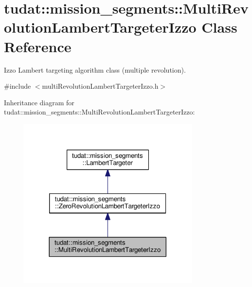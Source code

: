 \hypertarget{classtudat_1_1mission__segments_1_1MultiRevolutionLambertTargeterIzzo}{}\section{tudat\+:\+:mission\+\_\+segments\+:\+:Multi\+Revolution\+Lambert\+Targeter\+Izzo Class Reference}
\label{classtudat_1_1mission__segments_1_1MultiRevolutionLambertTargeterIzzo}


Izzo Lambert targeting algorithm class (multiple revolution).  




{\ttfamily \#include $<$multi\+Revolution\+Lambert\+Targeter\+Izzo.\+h$>$}



Inheritance diagram for tudat\+:\+:mission\+\_\+segments\+:\+:Multi\+Revolution\+Lambert\+Targeter\+Izzo\+:
\nopagebreak
\begin{figure}[H]
\begin{center}
\leavevmode
\includegraphics[width=260pt]{classtudat_1_1mission__segments_1_1MultiRevolutionLambertTargeterIzzo__inherit__graph}
\end{center}
\end{figure}


